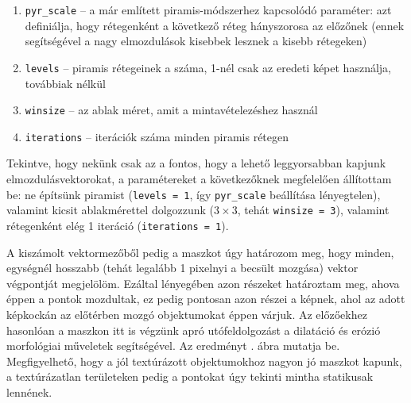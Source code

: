 \begin{enumerate}
\item \texttt{pyr\_scale} -- a már említett piramis-módszerhez kapcsolódó paraméter: azt definiálja, hogy rétegenként a következő réteg hányszorosa az előzőnek (ennek segítségével a nagy elmozdulások kisebbek lesznek a kisebb rétegeken)
\item \texttt{levels} -- piramis rétegeinek a száma, 1-nél csak az eredeti képet használja, továbbiak nélkül
\item \texttt{winsize} -- az ablak méret, amit a mintavételezéshez használ
\item \texttt{iterations} -- iterációk száma minden piramis rétegen
\end{enumerate}

Tekintve, hogy nekünk csak az a fontos, hogy a lehető leggyorsabban kapjunk elmozdulásvektorokat, a paramétereket a következőknek megfelelően állítottam be: ne építsünk piramist (\texttt{levels = 1}, így \texttt{pyr\_scale} beállítása lényegtelen), valamint kicsit ablakmérettel dolgozzunk ($3\times 3$, tehát \texttt{winsize = 3}), valamint rétegenként elég 1 iteráció (\texttt{iterations = 1}).

A kiszámolt vektormezőből pedig a maszkot úgy határozom meg, hogy minden, egységnél hosszabb (tehát legalább 1 pixelnyi a becsült mozgása) vektor végpontját megjelölöm. Ezáltal lényegében azon részeket határoztam meg, ahova éppen a pontok mozdultak, ez pedig pontosan azon részei a képnek, ahol az adott képkockán az előtérben mozgó objektumokat éppen várjuk. Az előzőekhez hasonlóan a maszkon itt is végzünk apró utófeldolgozást a dilatáció és erózió morfológiai műveletek segítségével. Az eredményt . ábra mutatja be. Megfigyelhető, hogy a jól textúrázott objektumokhoz nagyon jó maszkot kapunk, a textúrázatlan területeken pedig a pontokat úgy tekinti mintha statikusak lennének.

